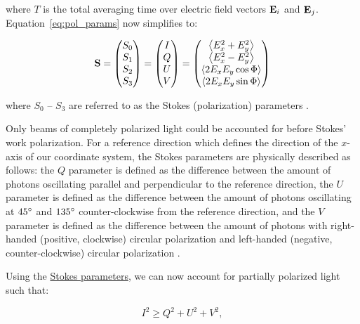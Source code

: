 \noindent where $T$ is the total averaging time over electric field vectors $\mathbf{E}_{i}$ and $\mathbf{E}_{j}$. Equation~\ref{eq:pol_params} now simplifies to:

\begin{equation}
    \mathbf{S} =
    \begin{pmatrix}
        S_{0} \\
        S_{1} \\
        S_{2} \\
        S_{3}
    \end{pmatrix}
    =
    \begin{pmatrix}
        I \\
        Q \\
        U \\
        V
    \end{pmatrix}
    =
    \begin{pmatrix}
        \left< E_{x}^{2} + E_{y}^{2} \right>   \\
        \left< E_{x}^{2} - E_{y}^{2} \right>   \\
        \left< 2 E_{x} E_{y} \cos \Phi \right> \\
        \left< 2 E_{x} E_{y} \sin \Phi \right>
    \end{pmatrix}
    \label{eq:Stokes_params}
\end{equation}

\noindent where $S_{0}$ -- $ S_{3}$ are referred to as the Stokes (polarization) parameters \citep{Stokes}.
\prgph

Only beams of completely polarized light could be accounted for before Stokes' work polarization. For a reference direction which defines the direction of the $x$-axis of our coordinate system, the Stokes parameters are physically described as follows: the $Q$ parameter is defined as the difference between the amount of photons oscillating parallel and perpendicular to the reference direction, the $U$ parameter is defined as the difference between the amount of photons oscillating at $45\hbox{$^\circ$}$ and $135\hbox{$^\circ$}$ counter-clockwise from the reference direction, and the $V$ parameter is defined as the difference between the amount of photons with right-handed (positive, clockwise) circular polarization and left-handed (negative, counter-clockwise) circular polarization \citep{Stokes}.
\prgph

Using the \hyperref[eq:Stokes_params]{Stokes parameters}, we can now account for partially polarized light such that:

\begin{equation}
    I^{2} \geq  Q^{2} + U^{2} + V^{2},
\end{equation}

